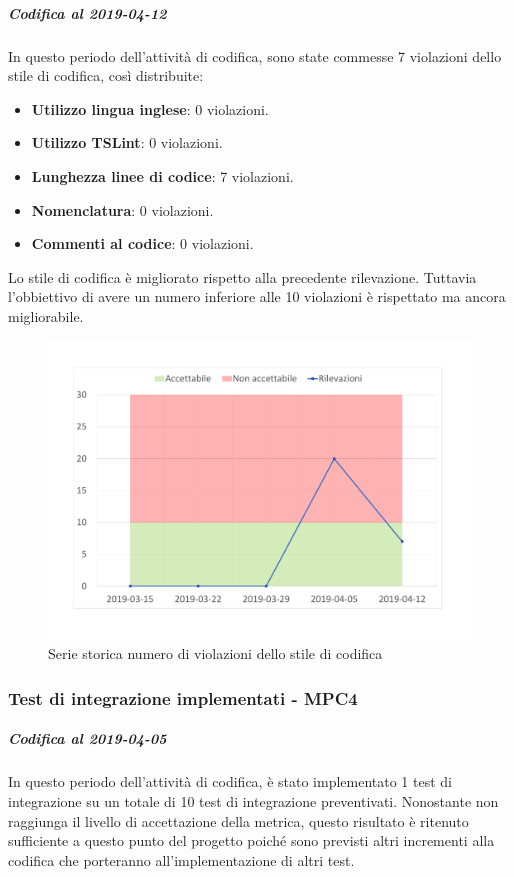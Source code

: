 \subparagraph{Codifica al 2019-04-12}
In questo periodo dell'attività di codifica, sono state commesse 7 violazioni dello stile di codifica, così distribuite:
 \begin{itemize}
 	\item \textbf{Utilizzo lingua inglese}: 0 violazioni.
 	\item \textbf{Utilizzo TSLint}: 0 violazioni.
 	\item \textbf{Lunghezza linee di codice}: 7 violazioni.
 	\item \textbf{Nomenclatura}: 0 violazioni.
 	\item \textbf{Commenti al codice}: 0 violazioni.
 \end{itemize}
Lo stile di codifica è migliorato rispetto alla precedente rilevazione. Tuttavia l'obbiettivo di avere un numero inferiore alle 10 violazioni è rispettato ma ancora migliorabile.
\begin{figure}[H]
	\centering
	\includegraphics[scale=0.6]{images/resoconto/MPC3Chart.pdf}
	\caption{Serie storica numero di violazioni dello stile di codifica}	
\end{figure}

\subsubsection{Test di integrazione implementati - MPC4}
\subparagraph{Codifica al 2019-04-05}
In questo periodo dell'attività di codifica, è stato implementato 1 test di integrazione su un totale di 10 test di integrazione preventivati.
Nonostante non raggiunga il livello di accettazione della
metrica, questo risultato è ritenuto sufficiente a questo punto del progetto poiché sono previsti altri incrementi alla codifica che porteranno all'implementazione di altri test.

